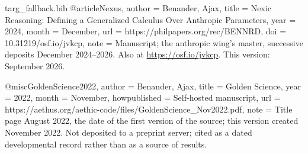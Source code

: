 \begin{filecontents}[overwrite]{targ_fallback.bib}
@article{Nexus,
  author      = {Benander, Ajax},
  title       = {Nexic Reasoning: Defining a Generalized Calculus Over Anthropic Parameters},
  year        = {2024},
  month       = {December},
  url         = {https://philpapers.org/rec/BENNRD},
  doi         = {10.31219/osf.io/jvkcp},
  note        = {Manuscript; the anthropic wing's master, successive deposits
                 December 2024--2026. Also at \url{https://osf.io/jvkcp}.
                 This version: September 2026.}
}

@misc{GoldenScience2022,
  author       = {Benander, Ajax},
  title        = {Golden Science},
  year         = {2022},
  month        = {November},
  howpublished = {Self-hosted manuscript},
  url          = {https://aethus.org/aethic-code/files/GoldenScience_Nov2022.pdf},
  note         = {Title page August 2022, the date of the first version of the source; this version created November 2022. Not deposited to a
                  preprint server; cited as a dated developmental record rather than
                  as a source of results.}
}
\end{filecontents}

